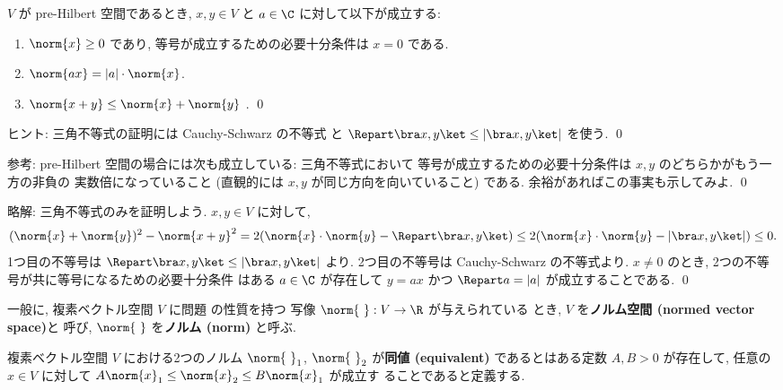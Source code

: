 \documentclass[12pt,twoside]{jarticle}
\newcommand\commentout[1]{#1}
\newcommand\commentout[1]{}
\begin{document}

\begin{question}[ノルムの基本性質]
\label{q:norm-axioms}
  $V$ が pre-Hilbert 空間であるとき, 
  $x,y\in V$ と $a\in\C$ に対して以下が成立する:
  \begin{enumerate}
  \item $\norm{x}\ge 0$ であり, 
    等号が成立するための必要十分条件は $x=0$ である.
  \item $\norm{ax}=|a|\cdot\norm{x}$.
  \item $\norm{x+y}\le\norm{x}+\norm{y}$
    . 
    \qed
  \end{enumerate}
\end{question}

\noindent 
ヒント: 三角不等式の証明には Cauchy-Schwarz の不等式
と $\Repart\bra x,y\ket\le|\bra x,y\ket|$ を使う.
\qed

\medskip
\noindent
参考: pre-Hilbert 空間の場合には次も成立している: 三角不等式において
等号が成立するための必要十分条件は $x,y$ のどちらかがもう一方の非負の
実数倍になっていること (直観的には $x,y$ が同じ方向を向いていること) である.
余裕があればこの事実も示してみよ.
\qed

\commentout{
\medskip
\noindent
略解: 三角不等式のみを証明しよう. $x,y\in V$ に対して,
\begin{equation*}
  (\norm{x}+\norm{y})^2 - \norm{x+y}^2
  = 2(\norm{x}\cdot\norm{y} - \Repart\bra x,y\ket)
  \le 2(\norm{x}\cdot\norm{y} - |\bra x,y\ket|)
  \le 0.
\end{equation*}
1つ目の不等号は $\Repart\bra x,y\ket\le|\bra x,y\ket|$ より.
2つ目の不等号は Cauchy-Schwarz の不等式より.
$x\ne 0$ のとき, 2つの不等号が共に等号になるための必要十分条件
はある $a\in\C$ が存在して $y=ax$ 
かつ $\Repart a = |a|$ が成立することである.
\qed
}

\medskip

一般に, 複素ベクトル空間 $V$ に問題  の性質を持つ
写像 $\norm{{\ }}:V\to\R$ が与えられている
とき, $V$ を{\bf ノルム空間 (normed vector space)}と
呼び, $\norm{{\ }}$ を{\bf ノルム (norm)} と呼ぶ.

複素ベクトル空間 $V$ における2つのノルム $\norm{{\ }}_1$, $\norm{{\ }}_2$ 
が{\bf 同値 (equivalent)} であるとはある定数 $A,B>0$ が存在して, 
任意の $x\in V$ に対して $A\norm{x}_1\le\norm{x}_2\le B\norm{x}_1$ が成立す
ることであると定義する.
\end{document}
